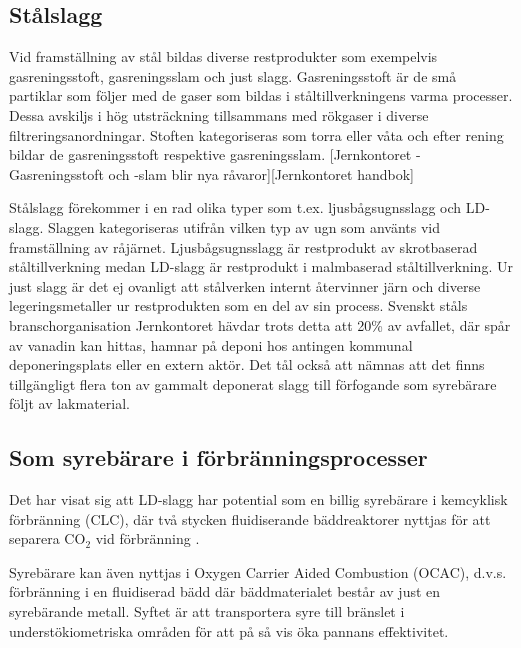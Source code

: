 \documentclass{article}
\begin{document}
\subsection{Stålslagg}
Vid framställning av stål bildas diverse restprodukter som exempelvis gasreningsstoft, gasreningsslam och just slagg. Gasreningsstoft är de små partiklar som följer med de gaser som bildas i ståltillverkningens varma processer. Dessa avskiljs i hög utsträckning tillsammans med rökgaser i diverse filtreringsanordningar. Stoften kategoriseras som torra eller våta och efter rening  bildar de gasreningsstoft respektive gasreningsslam. [Jernkontoret - Gasreningsstoft och -slam blir nya råvaror][Jernkontoret handbok] 

Stålslagg förekommer i en rad olika typer som t.ex. ljusbågsugnsslagg och LD-slagg\cite{Pehlke2014a}. 
Slaggen kategoriseras utifrån vilken typ av ugn som använts vid framställning av råjärnet. Ljusbågsugnsslagg är restprodukt av skrotbaserad ståltillverkning medan LD-slagg är restprodukt i malmbaserad ståltillverkning\cite{Pehlke2014a}.
Ur just slagg är det ej ovanligt att stålverken internt återvinner järn och diverse legeringsmetaller ur restprodukten som en del av sin process.  Svenskt ståls branschorganisation Jernkontoret hävdar trots detta att 20\% av avfallet, där spår av vanadin kan hittas, hamnar på deponi hos antingen kommunal deponeringsplats eller en extern aktör\cite{PontusWestrin}. Det tål också att nämnas att det finns tillgängligt flera ton av gammalt deponerat slagg till förfogande som syrebärare följt av lakmaterial.


\subsection{Som syrebärare i förbränningsprocesser}
Det har visat sig att LD-slagg har potential som en billig syrebärare i kemcyklisk förbränning (CLC), där två stycken fluidiserande bäddreaktorer nyttjas för att separera CO$_2$ vid förbränning \cite{Xu2017}.
 
Syrebärare kan även nyttjas i Oxygen Carrier Aided Combustion (OCAC), d.v.s. förbränning i en fluidiserad bädd där bäddmaterialet består av just en syrebärande metall.
Syftet är att transportera syre till bränslet i understökiometriska områden för att på så vis öka pannans effektivitet\cite{Zevenhoven2018}.
 
\end{document}
